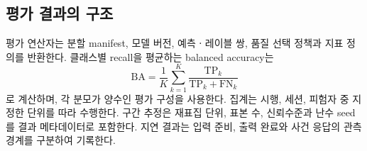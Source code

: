 \subsection{평가 결과의 구조}
평가 연산자는 분할 manifest, 모델 버전, 예측ㆍ레이블 쌍, 품질 선택 정책과 지표 정의를 반환한다.
클래스별 recall을 평균하는 balanced accuracy는
\begin{equation}
 \mathrm{BA}=\frac1K\sum_{k=1}^{K}
 \frac{\mathrm{TP}_k}{\mathrm{TP}_k+\mathrm{FN}_k}
\end{equation}
로 계산하며, 각 분모가 양수인 평가 구성을 사용한다.
집계는 시행, 세션, 피험자 중 지정한 단위를 따라 수행한다.
구간 추정은 재표집 단위, 표본 수, 신뢰수준과 난수 seed를 결과 메타데이터로 포함한다.
지연 결과는 입력 준비, 출력 완료와 사건 응답의 관측 경계를 구분하여 기록한다.

